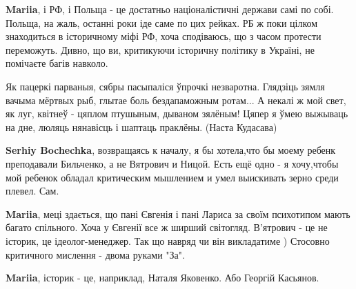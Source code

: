 \begin{itemize}
\begin{itemize}
\textbf{Mariia}, і РФ, і Польща - це достатньо націоналістичні держави самі по собі. Польща, на жаль, останні роки іде саме по цих рейках. РБ ж поки цілком знаходиться в історичному міфі РФ, хоча сподіваюсь, що з часом протести переможуть. Дивно, що ви, критикуючи історичну політику в Україні, не помічаєте багів навколо.

 
\obeycr
Як пацеркі парваныя, сябры
пасыпаліся ўпрочкі незваротна.
Глядзіць зямля вачыма мёртвых рыб,
глытае боль бездапаможным ротам...
А некалі ж мой свет, як луг, квітнеў -
цяплом птушыным, дываном зялёным!
Цяпер я ўмею выжываць на дне,
люляць нянавісць і шаптаць праклёны.
(Наста Кудасава)
\restorecr

 
\textbf{Serhiy Bochechka}, возвращаясь к началу, я бы хотела,что бы моему ребенк преподавали Бильченко, а не Вятрович и Ницой.
Есть ещё одно - я хочу,чтобы мой ребенок обладал критическим мышлением и умел выискивать зерно среди плевел. Сам.

 
\textbf{Mariia}, меці здається, що пані Євгенія і пані Лариса за своїм психотипом мають багато спільного. Хоча у Євгенії все ж ширший світогляд. В'ятрович - це не історик, це ідеолог-менеджер. Так що навряд чи він викладатиме )
Стосовно критичного мислення - двома руками "За".

 
\textbf{Mariia}, історик - це, наприклад, Наталя Яковенко. Або Георгій Касьянов.

 

\end{itemize}
\end{itemize}
